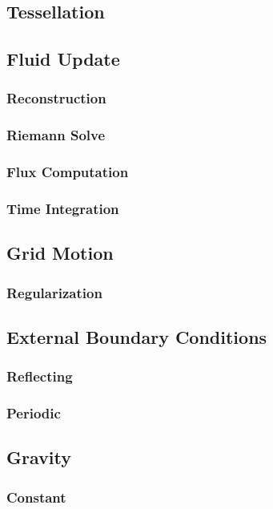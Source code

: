 \subsection{Tessellation}

\subsection{Fluid Update}
\subsubsection{Reconstruction}
\subsubsection{Riemann Solve}
\subsubsection{Flux Computation}
\subsubsection{Time Integration}

\subsection{Grid Motion}
\subsubsection{Regularization}

\subsection{External Boundary Conditions}
\subsubsection{Reflecting}
\subsubsection{Periodic}

\subsection{Gravity}
\subsubsection{Constant}
